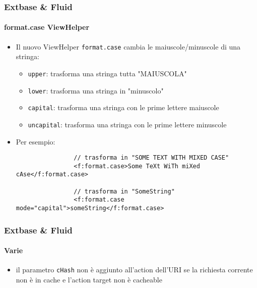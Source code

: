 
\begin{frame}[fragile]
	\frametitle{Extbase \& Fluid}
	\framesubtitle{format.case ViewHelper}

	\begin{itemize}

		\item Il nuovo ViewHelper \texttt{format.case} cambia le maiuscole/minuscole di una stringa:
			\begin{itemize}
				\item \texttt{upper}: trasforma una stringa tutta "MAIUSCOLA"
				\item \texttt{lower}: trasforma una stringa in "minuscolo"
				\item \texttt{capital}: trasforma una stringa con le prime lettere maiuscole
				\item \texttt{uncapital}: trasforma una stringa con le prime lettere minuscole
			\end{itemize}

		\item Per esempio:

			\begin{lstlisting}
				// trasforma in "SOME TEXT WITH MIXED CASE"
				<f:format.case>Some TeXt WiTh miXed cAse</f:format.case>

				// trasforma in "SomeString"
				<f:format.case mode="capital">someString</f:format.case>
			\end{lstlisting}

	\end{itemize}

\end{frame}


\begin{frame}[fragile]
	\frametitle{Extbase \& Fluid}
	\framesubtitle{Varie}

	\begin{itemize}

		\item il parametro \texttt{cHash} non è aggiunto all'action dell'URI se la richiesta
			corrente non è in cache e l'action target non è cacheable

	\end{itemize}

\end{frame}
